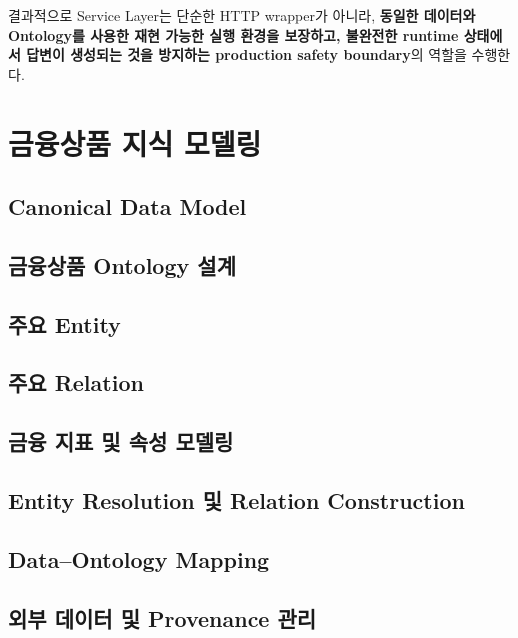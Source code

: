 \documentclass[11pt,a4paper]{article}
\begin{document}
결과적으로 Service Layer는 단순한 HTTP wrapper가 아니라,
\textbf{동일한 데이터와 Ontology를 사용한 재현 가능한 실행 환경을 보장하고,
불완전한 runtime 상태에서 답변이 생성되는 것을 방지하는
production safety boundary}의 역할을 수행한다.

\section{금융상품 지식 모델링}

\subsection{Canonical Data Model}


\subsection{금융상품 Ontology 설계}


\subsection{주요 Entity}


\subsection{주요 Relation}


\subsection{금융 지표 및 속성 모델링}


\subsection{Entity Resolution 및 Relation Construction}


\subsection{Data--Ontology Mapping}


\subsection{외부 데이터 및 Provenance 관리}
\end{document}
